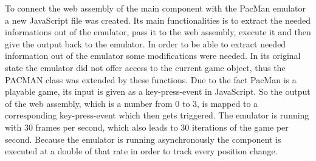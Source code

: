 To connect the web assembly of the main component with the PacMan emulator a new JavaScript file was created. Its main functionalities is to extract the needed informations out of the emulator, pass it to the web assembly, execute it and then give the output back to the emulator. In order to be able to extract needed information out of the emulator some modifications were needed. In its original state the emulator did not offer access to the current game object, thus the PACMAN class was extended by these functions. Due to the fact PacMan is a playable game, its input is given as a key-press-event in JavaScript. So the output of the web assembly, which is a number from 0 to 3, is mapped to a corresponding key-press-event which then gets triggered. The emulator is running with 30 frames per second, which also leads to 30 iterations of the game per second. Because the emulator is running asynchronously the component is executed at a double of that rate in order to track every position change.

